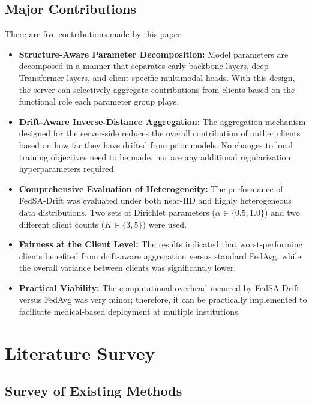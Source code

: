 \documentclass{ieeeaccess}
\newcommand{\sadrift}{FedSA-Drift}
\begin{document}
\subsection{Major Contributions}

There are five contributions made by this paper:

\begin{itemize}
    \item \textbf{Structure-Aware Parameter Decomposition:} Model parameters are decomposed in a manner that separates early backbone layers, deep Transformer layers, and client-specific multimodal heads. With this design, the server can selectively aggregate contributions from clients based on the functional role each parameter group plays.

    \item \textbf{Drift-Aware Inverse-Distance Aggregation:} The aggregation mechanism designed for the server-side reduces the overall contribution of outlier clients based on how far they have drifted from prior models. No changes to local training objectives need to be made, nor are any additional regularization hyperparameters required.

    \item \textbf{Comprehensive Evaluation of Heterogeneity:} The performance of \sadrift{} was evaluated under both near-IID and highly heterogeneous data distributions. Two sets of Dirichlet parameters ($\alpha \in \{0.5, 1.0\}$) and two different client counts ($K \in \{3, 5\}$) were used.

    \item \textbf{Fairness at the Client Level:} The results indicated that worst-performing clients benefited from drift-aware aggregation versus standard FedAvg, while the overall variance between clients was significantly lower.

    \item \textbf{Practical Viability:} The computational overhead incurred by \sadrift{} versus FedAvg was very minor; therefore, it can be practically implemented to facilitate medical-based deployment at multiple institutions.

\end{itemize}

\section{Literature Survey}
\subsection{Survey of Existing Methods}
\end{document}
